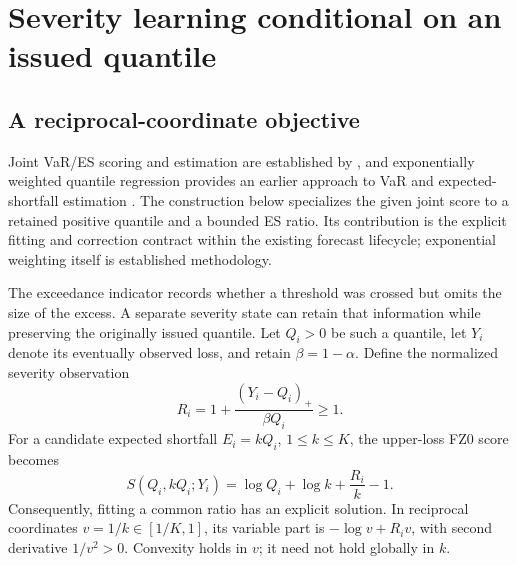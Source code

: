 \documentclass[11pt,a4paper]{article}
\theoremstyle{definition}\newtheorem{definition}[theorem]{Definition}
\begin{document}
\section{Severity learning conditional on an issued quantile}\label{sec:severity}
\subsection{A reciprocal-coordinate objective}
Joint VaR/ES scoring and estimation are established by \citet{patton2019es}, and exponentially weighted quantile regression provides an earlier approach to VaR and expected-shortfall estimation \cite{taylor2008ewqr}. The construction below specializes the given joint score to a retained positive quantile and a bounded ES ratio. Its contribution is the explicit fitting and correction contract within the existing forecast lifecycle; exponential weighting itself is established methodology.

The exceedance indicator records whether a threshold was crossed but omits the size of the excess. A separate severity state can retain that information while preserving the originally issued quantile. Let $Q_i>0$ be such a quantile, let $Y_i$ denote its eventually observed loss, and retain $\beta=1-\alpha$. Define the normalized severity observation
\begin{equation}
 R_i=1+\frac{(Y_i-Q_i)_+}{\beta Q_i}\ge1.
 \label{eq:severityobservation}
\end{equation}
For a candidate expected shortfall $E_i=kQ_i$, $1\le k\le K$, the upper-loss FZ0 score becomes
\begin{equation}
 S(Q_i,kQ_i;Y_i)=\log Q_i+\log k+\frac{R_i}{k}-1.
 \label{eq:severityobjective}
\end{equation}
Consequently, fitting a common ratio has an explicit solution. In reciprocal coordinates $v=1/k\in[1/K,1]$, its variable part is $-\log v+R_i v$, with second derivative $1/v^2>0$. Convexity holds in $v$; it need not hold globally in $k$.
\end{document}
